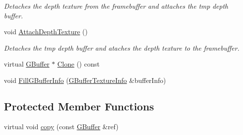 \begin{DoxyCompactItemize}
\begin{DoxyCompactList}\small\item\em Detaches the depth texture from the framebuffer and attaches the tmp depth buffer. \end{DoxyCompactList}\item 
\mbox{\label{class_geometry_engine_1_1_geometry_buffer_1_1_g_buffer_a3a95e0e90117676e44a29c09eb15c65d}} 
void \mbox{\hyperlink{class_geometry_engine_1_1_geometry_buffer_1_1_g_buffer_a3a95e0e90117676e44a29c09eb15c65d}{Attach\+Depth\+Texture}} ()
\begin{DoxyCompactList}\small\item\em Detaches the tmp depth buffer and ataches the depth texture to the framebuffer. \end{DoxyCompactList}\item 
virtual \mbox{\hyperlink{class_geometry_engine_1_1_geometry_buffer_1_1_g_buffer}{G\+Buffer}} $\ast$ \mbox{\hyperlink{class_geometry_engine_1_1_geometry_buffer_1_1_g_buffer_af993f8c23f7e78051f3071be4873af9d}{Clone}} () const
\item 
void \mbox{\hyperlink{class_geometry_engine_1_1_geometry_buffer_1_1_g_buffer_ad1242e69d277b69b58497f7d489e176c}{Fill\+G\+Buffer\+Info}} (\mbox{\hyperlink{class_geometry_engine_1_1_g_buffer_texture_info}{G\+Buffer\+Texture\+Info}} \&buffer\+Info)
\end{DoxyCompactItemize}
\subsection*{Protected Member Functions}
\begin{DoxyCompactItemize}
\item 
virtual void \mbox{\hyperlink{class_geometry_engine_1_1_geometry_buffer_1_1_g_buffer_a9f20eb78703ef048d59a54f90ee09f25}{copy}} (const \mbox{\hyperlink{class_geometry_engine_1_1_geometry_buffer_1_1_g_buffer}{G\+Buffer}} \&ref)
\end{DoxyCompactItemize}
